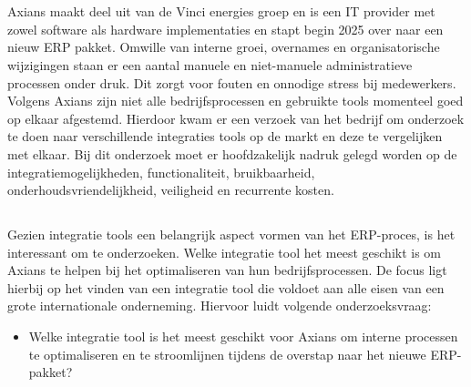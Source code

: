 
\chapter{}%
\label{ch:inleiding}

\section{}%
\label{sec:probleemstelling}

Axians maakt deel uit van de Vinci energies groep en is een IT provider met zowel software als hardware implementaties en stapt begin 2025 over naar een nieuw ERP pakket. Omwille van interne groei, overnames en organisatorische wijzigingen staan er een aantal manuele en niet-manuele administratieve processen onder druk. Dit zorgt voor fouten en onnodige stress bij medewerkers. Volgens Axians zijn niet alle bedrijfsprocessen en gebruikte tools momenteel goed op elkaar afgestemd. Hierdoor kwam er een verzoek van het bedrijf om onderzoek te doen naar verschillende integraties tools op de markt en deze te vergelijken met elkaar. Bij dit onderzoek moet er hoofdzakelijk nadruk gelegd worden op de integratiemogelijkheden, functionaliteit, bruikbaarheid, onderhoudsvriendelijkheid, veiligheid en recurrente kosten.

\section{}%
\label{sec:onderzoeksvraag}

Gezien integratie tools een belangrijk aspect vormen van het ERP-proces, is het interessant om te onderzoeken. Welke integratie tool het meest geschikt is om Axians te helpen bij het optimaliseren van hun bedrijfsprocessen. De focus ligt hierbij op het vinden van een integratie tool die voldoet aan alle eisen van een grote internationale onderneming. Hiervoor luidt volgende onderzoeksvraag:

\begin{itemize}
  \item Welke integratie tool is het meest geschikt voor Axians om interne processen te optimaliseren en te stroomlijnen tijdens de overstap naar het nieuwe ERP-pakket?
\end{itemize}

